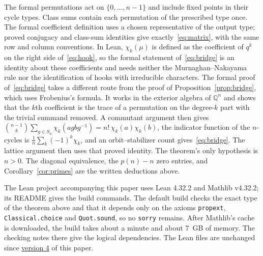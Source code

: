 \documentclass[11pt]{article}
\theoremstyle{remark}
\newcommand{\Q}{\mathbb{Q}}
\begin{document}
The formal permutations act on $\{0,\ldots,n-1\}$ and include fixed
points in their cycle types. Class sums contain each permutation of the
prescribed type once. The formal coefficient definition uses a chosen
representative of the output type; proved conjugacy and class-sum
identities give exactly~\eqref{eq:matrix}, with the same row and column
conventions. In Lean, $\chi_k(\mu)$ is defined as the coefficient of
$q^k$ on the right side of~\eqref{eq:hook}, so the formal statement
of~\eqref{eq:bridge} is an identity about these coefficients and needs
neither the Murnaghan--Nakayama rule nor the identification of hooks with
irreducible characters. The formal proof of~\eqref{eq:bridge} takes a different route from the
proof of Proposition~\ref{prop:bridge}, which uses Frobenius's formula.
It works in the exterior algebra of $\Q^n$ and shows that the
$k$th coefficient is the trace of a permutation on the degree-$k$ part
with the trivial summand removed. A commutant argument then gives
$\binom{n-1}{k}\sum_{g\in S_n}\chi_k(agbg^{-1})=n!\,\chi_k(a)\chi_k(b)$,
the indicator function of the $n$-cycles is
$\frac1n\sum_k(-1)^k\chi_k$, and an orbit--stabilizer count
gives~\eqref{eq:bridge}. The lattice argument then uses that proved
identity. The theorem's only hypothesis is $n>0$.
The diagonal equivalence, the $p(n)-n$ zero entries, and
Corollary~\ref{cor:primes} are the written deductions above.

The Lean project accompanying this paper uses Lean 4.32.2 and Mathlib
v4.32.2; its README gives the build commands. The default build checks
the exact type of the theorem above and that it depends only on the
axioms \texttt{propext}, \texttt{Classical.choice} and
\texttt{Quot.sound}, so no \texttt{sorry} remains. After Mathlib's
cache is downloaded, the build takes about a minute and about 7~GB of
memory. The checking notes there give the logical dependencies.
The Lean files are unchanged since
\href{https://github.com/6/clank-lab/tree/stanley-class-sum-snf-v4/results/stanley-class-sum-snf}{version 4}
of this paper.
\end{document}
